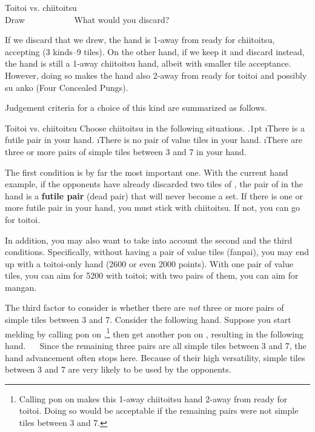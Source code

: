 \bigskip
\begin{itembox}[r]{{\jap Toitoi} vs. {\jap chiitoitsu}}
\bp
{}\fa\fa\bei~\\
\hfill\footnotesize{Draw~~~~~~~~~~~}
\ep
\vspace{-17pt}What would you discard? \vspace{-5pt}
\end{itembox}

\bigskip
\noindent If we discard {\LARGE{}} that we drew, the hand is 1-away from ready for {\jap chiitoitsu}, accepting {\LARGE{}\bei} (3 kinds--9 tiles). On the other hand, if we keep it and discard {\LARGE{}} instead, the hand is still a 1-away {\jap chiitoitsu} hand, albeit with smaller tile acceptance. However, doing so makes the hand also 2-away from ready for {\jap toitoi} and possibly {\jap su anko} (Four Concealed Pungs).

\bigskip
\noindent Judgement criteria for a choice of this kind are summarized as follows.
\bigskip
\begin{itembox}[c]{{\jap Toitoi} vs. {\jap chiitoitsu}}
Choose {\jap chiitoitsu} in the following situations.
\be\itemsep.1pt
\i There is a futile pair in your hand.
\i There is no pair of value tiles in your hand.
\i There are three or more pairs of simple tiles between 3 and 7 in your hand.
\ee
\end{itembox}

\bigskip
\noindent The first condition is by far the most important one. With the current hand example, if the opponents have already discarded two tiles of {\LARGE{}}, the pair of {\LARGE{}} in the hand is a {\bf futile pair} (dead pair) that will never become a set. If there is one or more futile pair in your hand, you must stick with {\jap chiitoitsu}. If not, you can go for {\jap toitoi}.

\bigskip
In addition, you may also want to take into account the second and the third conditions. Specifically, without having a pair of value tiles ({\jap fanpai}), you may end up with a {\jap toitoi}-only hand (2600 or even 2000 points). With one pair of value tiles, you can aim for 5200 with {\jap toitoi}; with two pairs of them, you can aim for {\jap mangan}.

\bigskip
The third factor to consider is whether there are \emph{not} three or more pairs of simple tiles between 3 and 7. Consider the following hand.
\bp
{}\bai\bai\fa\zhong
\ep
Suppose you start melding by calling {\jap pon} on {\LARGE\bai},\footnote{Calling {\jap pon} on {\bai} makes this 1-away {\jap chiitoitsu} hand 2-away from ready for {\jap toitoi}. Doing so would be acceptable if the remaining pairs were not simple tiles between 3 and 7.} then get another {\jap pon} on {\LARGE{}}, resulting in the following hand.
\bp
{}\zhong~~\bai\rbai\bai
\ep
Since the remaining three pairs are all simple tiles between 3 and 7, the hand advancement often stops here. Because of their high versatility, simple tiles between 3 and 7 are very likely to be used by the opponents.

